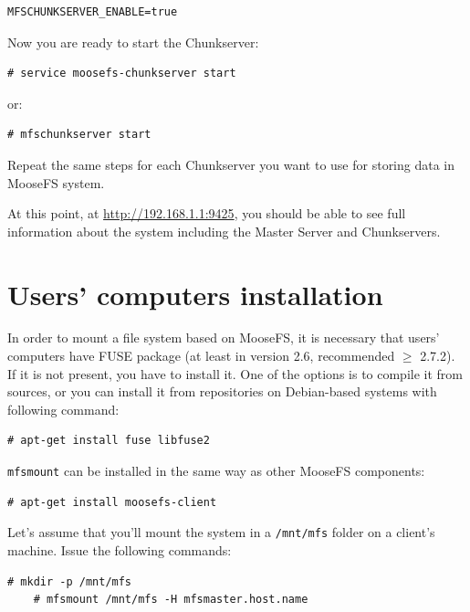 \documentclass[a4paper,11pt,english]{report}
\def\code#1{\texttt{#1}}
\begin{document}
			\begin{lstlisting}[caption={Configuring autostart of MooseFS Chunkserver}]
	MFSCHUNKSERVER_ENABLE=true
			\end{lstlisting}
			
			
			Now you are ready to start the Chunkserver:
			
			\begin{lstlisting}[caption={Starting MooseFS Chunkserver}]
	# service moosefs-chunkserver start
			\end{lstlisting}
			
			or:
			
			\begin{lstlisting}[caption={Starting MooseFS Chunkserver}]
	# mfschunkserver start
			\end{lstlisting}
			
			
			Repeat the same steps for each Chunkserver you want to use for storing data in MooseFS system.
			
			At this point, at \url{http://192.168.1.1:9425}, you should be able to see full information about the system including the Master Server and Chunkservers.
			
		\section{Users' computers installation}
			In order to mount a file system based on MooseFS, it is necessary that users' computers have FUSE package (at least in version 2.6, recommended $\geq$ 2.7.2). If it is not present, you have to install it. One of the options is to compile it from sources, or you can install it from repositories on Debian-based systems with following command:
			
			\begin{lstlisting}[caption={Installing FUSE}]
	# apt-get install fuse libfuse2
			\end{lstlisting}
			
			
			\code{mfsmount} can be installed in the same way as other MooseFS components:
			
			\begin{lstlisting}[caption={Installing mfsmount}]
	# apt-get install moosefs-client
			\end{lstlisting}
			
			Let's assume that you'll mount the system in a \code{/mnt/mfs} folder on a client's machine. Issue the following commands:
			
			\begin{lstlisting}[caption={Mounting the Moose File System}]
	# mkdir -p /mnt/mfs
	# mfsmount /mnt/mfs -H mfsmaster.host.name
			\end{lstlisting}
			
\end{document}
